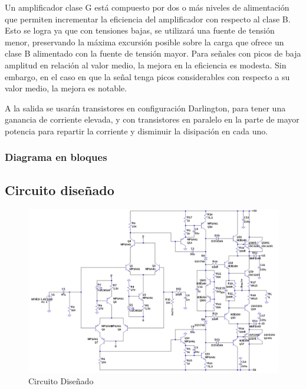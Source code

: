 \documentclass[a4paper,12pt,twoside]{article}
\begin{document}
Un amplificador clase G está compuesto por dos o más niveles de alimentación que permiten incrementar la eficiencia del amplificador con respecto al clase B. Esto se logra ya que con tensiones bajas, se utilizará una fuente de tensión menor, preservando la máxima excursión posible sobre la carga que ofrece un clase B alimentado con la fuente de tensión mayor. Para señales con picos de baja amplitud en relación al valor medio, la mejora en la eficiencia es modesta. Sin embargo, en el caso en que la señal tenga picos considerables con respecto a su valor medio, la mejora es notable.


A la salida se usarán transistores en configuración Darlington, para tener una ganancia de corriente elevada, y con transistores en paralelo en la parte de mayor potencia para repartir la corriente y disminuir la disipación en cada uno.



\subsubsection{Diagrama en bloques}







\subsection{Circuito diseñado}




\begin{figure}[H]
\centering
\includegraphics[width=0.75\paperheight,angle=90,origin=c]{img/circuito}
\caption{Circuito Diseñado}
\label{fig:circuito} 
\end{figure}
\end{document}
